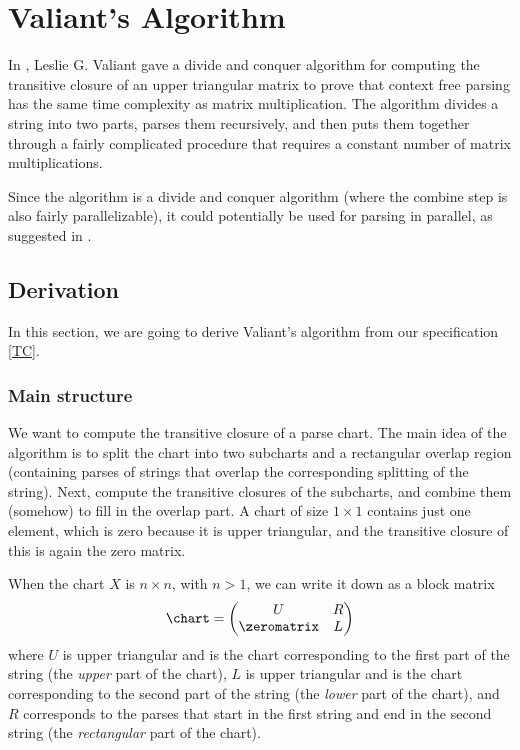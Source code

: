 \chapter{Valiant's Algorithm}
\label{Section:Valiant}
\label{Valiant}
In \cite{Valiant}, Leslie G. Valiant gave a divide and conquer algorithm for computing the transitive closure of an upper triangular matrix to prove that context free parsing has the same time complexity as matrix multiplication. The algorithm divides a string into two parts, parses them recursively, and then puts them together through a fairly complicated procedure that requires a constant number of matrix multiplications.

Since the algorithm is a divide and conquer algorithm (where the combine step is also fairly parallelizable), it could potentially be used for parsing in parallel, as suggested in \citep{JP-PP}.

\section{Derivation}
\label{Valiant:Der}
\label{Valiant:Derivation}
In this section, we are going to derive Valiant's algorithm from our specification \eqref{TC}.
\subsection{Main structure}
We want to compute the transitive closure of a parse chart. The main idea of the algorithm is to split the chart into two subcharts and a rectangular overlap region (containing parses of strings that overlap the corresponding splitting of the string). Next, compute the transitive closures of the subcharts, and combine them (somehow) to fill in the overlap part. A chart of size $1 \times 1$ contains just one element, which is zero because it is upper triangular, and the transitive closure of this is again the zero matrix.

\label{Section:Subdivision-in-Specification}
When the chart $X$ is $n \times n$, with $n > 1$, we can write it down as a block matrix 
\begin{equation*}
  \chart = 
  \begin{pmatrix}
    U & R \\
    \zeromatrix & L
  \end{pmatrix}
\end{equation*}
where $U$ is upper triangular and is the chart corresponding to the first part of the string (the \emph{upper} part of the chart), $L$ is upper triangular and is the chart corresponding to the second part of the string (the \emph{lower} part of the chart), and $R$ corresponds to the parses that start in the first string and end in the second string (the \emph{rectangular} part of the chart).

